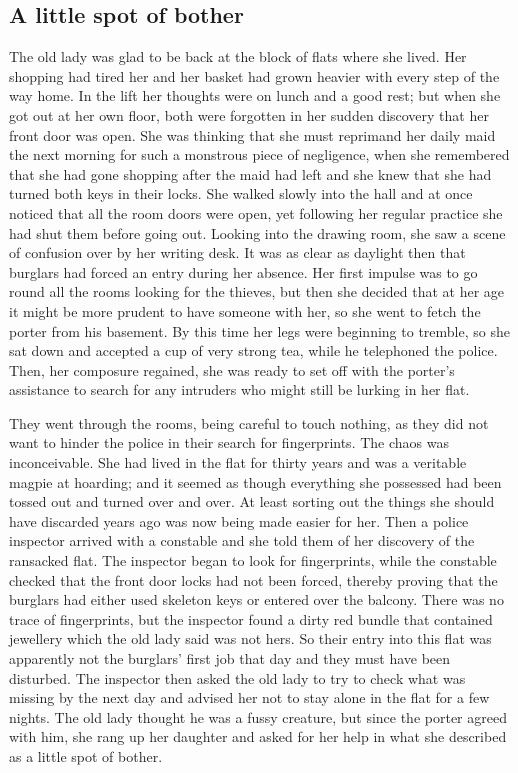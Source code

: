 \documentclass[11pt]{article}
\begin{document}
\subsection{A little spot of bother}
\label{sec-1-58}

The old lady was glad to be back at the block of flats where she lived. Her shopping had tired her and her basket had grown heavier with every step of the way home. In the lift her thoughts were on lunch and a good rest; but when she got out at her own floor, both were forgotten in her sudden discovery that her front door was open. She was thinking that she must reprimand her daily maid the next morning for such a monstrous piece of negligence, when she remembered that she had gone shopping after the maid had left and she knew that she had turned both keys in their locks. She walked slowly into the hall and at once noticed that all the room doors were open, yet following her regular practice she had shut them before going out. Looking into the drawing room, she saw a scene of confusion over by her writing desk. It was as clear as daylight then that burglars had forced an entry during her absence. Her first impulse was to go round all the rooms looking for the thieves, but then she decided that at her age it might be more prudent to have someone with her, so she went to fetch the porter from his basement. By this time her legs were beginning to tremble, so she sat down and accepted a cup of very strong tea, while he telephoned the police. Then, her composure regained, she was ready to set off with the porter's assistance to search for any intruders who might still be lurking in her flat. 

They went through the rooms, being careful to touch nothing, as they did not want to hinder the police in their search for fingerprints. The chaos was inconceivable. She had lived in the flat for thirty years and was a veritable magpie at hoarding; and it seemed as though everything she possessed had been tossed out and turned over and over. At least sorting out the things she should have discarded years ago was now being made easier for her. Then a police inspector arrived with a constable and she told them of her discovery of the ransacked flat. The inspector began to look for fingerprints, while the constable checked that the front door locks had not been forced, thereby proving that the burglars had either used skeleton keys or entered over the balcony. There was no trace of fingerprints, but the inspector found a dirty red bundle that contained jewellery which the old lady said was not hers. So their entry into this flat was apparently not the burglars' first job that day and they must have been disturbed. The inspector then asked the old lady to try to check what was missing by the next day and advised her not to stay alone in the flat for a few nights. The old lady thought he was a fussy creature, but since the porter agreed with him, she rang up her daughter and asked for her help in what she described as a little spot of bother. 
\end{document}
